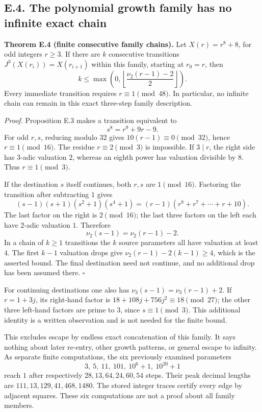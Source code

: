\documentclass[12pt]{article}
\begin{document}
\subsection{E.4. The polynomial growth family has no infinite exact
chain}\label{e.4.-the-polynomial-growth-family-has-no-infinite-exact-chain}

\textbf{Theorem E.4 (finite consecutive family chains).} Let
\(X(r)=r^8+8\), for odd integers \(r\ge3\). If there are \(k\)
consecutive transitions \(J^3(X(r_i))=X(r_{i+1})\) within this family,
starting at \(r_0=r\), then \[
k\le\max\left(0,\left\lfloor\frac{\nu_2(r-1)-2}{2}\right\rfloor\right).
\] Every immediate transition requires \(r\equiv1\pmod{48}\). In
particular, no infinite chain can remain in this exact three-step family
description.

\emph{Proof.} Proposition E.3 makes a transition equivalent to \[
s^8=r^9+9r-9.
\] For odd \(r,s\), reducing modulo \(32\) gives
\(10(r-1)\equiv0\pmod{32}\), hence \(r\equiv1\pmod{16}\). The residue
\(r\equiv2\pmod3\) is impossible. If \(3\mid r\), the right side has
\(3\)-adic valuation \(2\), whereas an eighth power has valuation
divisible by \(8\). Thus \(r\equiv1\pmod3\).

If the destination \(s\) itself continues, both \(r,s\) are
\(1\pmod{16}\). Factoring the transition after subtracting \(1\) gives
\[
(s-1)(s+1)(s^2+1)(s^4+1)
=(r-1)(r^8+r^7+\cdots+r+10).
\] The last factor on the right is \(2\pmod{16}\); the last three
factors on the left each have \(2\)-adic valuation \(1\). Therefore \[
\nu_2(s-1)=\nu_2(r-1)-2.
\] In a chain of \(k\ge1\) transitions the \(k\) source parameters all
have valuation at least \(4\). The first \(k-1\) valuation drops give
\(\nu_2(r-1)-2(k-1)\ge4\), which is the asserted bound. The final
destination need not continue, and no additional drop has been assumed
there. \(\square\)

For continuing destinations one also has \(\nu_3(s-1)=\nu_3(r-1)+2\). If
\(r=1+3j\), its right-hand factor is
\(18+108j+756j^2\equiv18\pmod{27}\); the other three left-hand factors
are prime to \(3\), since \(s\equiv1\pmod3\). This additional identity
is a written observation and is not needed for the finite bound.

This excludes escape by endless exact concatenation of this family. It
says nothing about later re-entry, other growth patterns, or general
escape to infinity. As separate finite computations, the six previously
examined parameters \[
3,\ 5,\ 11,\ 101,\ 10^6+1,\ 10^{20}+1
\] reach \(1\) after respectively \(28,13,64,24,60,54\) steps. Their
peak decimal lengths are \(111,13,129,41,468,1480\). The stored integer
traces certify every edge by adjacent squares. These six computations
are not a proof about all family members.
\end{document}
